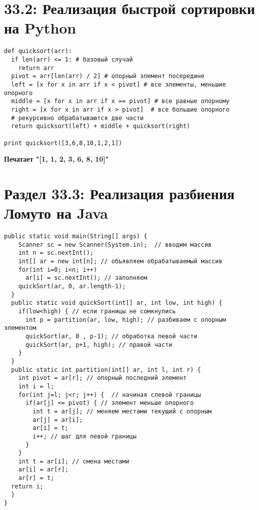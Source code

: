 \section*{33.2: Реализация быстрой сортировки на Python}
\begin{tcolorbox}
\begin{verbatim}
def quicksort(arr):
  if len(arr) <= 1: # базовый случай
    return arr
  pivot = arr[len(arr) / 2] # опорный элемент посередине
  left = [x for x in arr if x < pivot] # все элементы, меньшие опорного
  middle = [x for x in arr if x == pivot] # все равные опорному
  right = [x for x in arr if x > pivot]  # все большие опорного
  # рекурсивно обрабатываются две части
  return quicksort(left) + middle + quicksort(right)

print quicksort([3,6,8,10,1,2,1])
\end{verbatim}
\end{tcolorbox}
\textbf{Печатает "[1, 1, 2, 3, 6, 8, 10]"}
\section*{Раздел 33.3: Реализация разбиения Ломуто на Java}
\begin{tcolorbox}
\begin{verbatim}
public static void main(String[] args) {
    Scanner sc = new Scanner(System.in);  // вводим массив
    int n = sc.nextInt();
    int[] ar = new int[n]; // объявляем обрабатываемый массив
    for(int i=0; i<n; i++)
      ar[i] = sc.nextInt(); // заполняем
    quickSort(ar, 0, ar.length-1);
  }
  public static void quickSort(int[] ar, int low, int high) {
    if(low<high) { // если границы не сомкнулись
      int p = partition(ar, low, high); // разбиваем с опорным элементом
      quickSort(ar, 0 , p-1); // обработка левой части
      quickSort(ar, p+1, high); // правой части
    }
  }
  public static int partition(int[] ar, int l, int r) {
    int pivot = ar[r]; // опорный последний элемент
    int i = l;
    for(int j=l; j<r; j++) {  // начиная слевой границы
      if(ar[j] <= pivot) { // элемент меньше опорного
        int t = ar[j]; // меняем местами текущий с опорным
        ar[j] = ar[i];
        ar[i] = t;
        i++; // шаг для левой границы
      }
    }
    int t = ar[i]; // смена местами
    ar[i] = ar[r];
    ar[r] = t;
  return i;
  }
}
\end{verbatim}
\end{tcolorbox}














